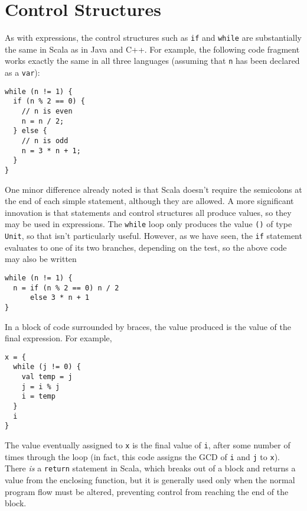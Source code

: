 \section{Control Structures}
As with expressions, the control structures such as \texttt{if} and \texttt{while} are substantially the same in Scala as in Java and C++. For example, the following code fragment works exactly the same in all three languages (assuming that \verb|n| has been declared as a \verb|var|):
\begin{verbatim}
while (n != 1) {
  if (n % 2 == 0) {
    // n is even
    n = n / 2;
  } else {
    // n is odd
    n = 3 * n + 1;
  }
}
\end{verbatim}
One minor difference already noted is that Scala doesn't require the semicolons at the end of each simple statement, although they are allowed. A more significant innovation is that statements and control structures all produce values, so they may be used in expressions. The \texttt{while} loop only produces the value \texttt{()} of type \texttt{Unit}, so that isn't particularly useful. However, as we have seen, the \texttt{if} statement evaluates to one of its two branches, depending on the test, so the above code may also be written
\begin{verbatim}
while (n != 1) {
  n = if (n % 2 == 0) n / 2
      else 3 * n + 1
}
\end{verbatim}

In a block of code surrounded by braces, the value produced is the value of the final expression. For example,
\begin{verbatim}
x = {
  while (j != 0) {
    val temp = j
    j = i % j
    i = temp
  }
  i
}
\end{verbatim}
The value eventually assigned to \texttt{x} is the final value of \texttt{i}, after some number of times through the loop (in fact, this code assigns the GCD of \texttt{i} and \texttt{j} to \texttt{x}). There \emph{is} a \texttt{return} statement in Scala, which breaks out of a block and returns a value from the enclosing function, but it is generally used only when the normal program flow must be altered, preventing control from reaching the end of the block.

